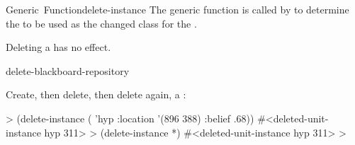 \documentclass[10pt,twoside,english,pdftex]{article}
\begin{document}
\begin{functiondoc}{Generic~Function}{delete-instance}
\fndescription The generic function
 is called by
 to determine the  to be used as
the changed class for the .

Deleting a  has
no effect.

\begin{alsos}{delete-blackboard-repository}
\end{alsos}

\fnexample
{}%
Create, then delete, then delete again, a  :
%
\W\supp
\begin{example}
  > (delete-instance ( 'hyp :location '(896 388) :belief .68))
  #<deleted-unit-instance hyp 311>
  > (delete-instance *)
  #<deleted-unit-instance hyp 311>
  >
\end{example}

\end{functiondoc}

\end{document}

